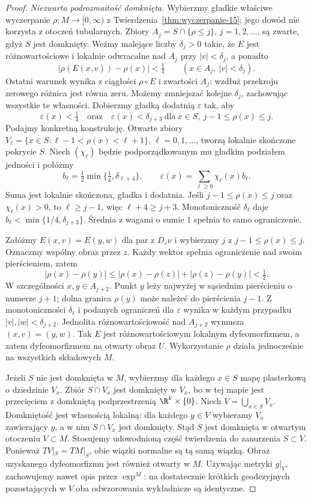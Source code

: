 \begin{proof}
\emph{Niezwarta podrozmaitość domknięta.}
Wybierzmy gładkie właściwe wyczerpanie
$\rho:M\to[0,\infty)$ z
Twierdzenia~\ref{thm:wyczerpanie-15}; jego dowód
nie korzysta z otoczeń tubularnych.
Zbiory $A_j=S\cap\{\rho\leq j\}$, $j=1,2,\ldots$,
są zwarte, gdyż $S$ jest domknięty.
Weźmy malejące liczby $\delta_j>0$
takie, że $E$ jest różnowartościowe
i lokalnie odwracalne nad $A_j$
przy $|v|<\delta_j$, a ponadto
\[
 |\rho(E(x,v))-\rho(x)|<\tfrac14
 \qquad(x\in A_j,\ |v|<\delta_j).
\]
Ostatni warunek wynika z ciągłości $\rho\circ E$
i zwartości $A_j$: wzdłuż przekroju zerowego
różnica jest równa zeru. Możemy zmniejszać kolejne
$\delta_j$, zachowując wszystkie te własności.
Dobierzmy gładką
dodatnią $\varepsilon$ tak, aby
\[
  \varepsilon(x)<\tfrac14
  \quad\text{oraz}\quad
  \varepsilon(x)<\delta_{j+3}
  \ \text{dla}\ x\in S,\
       j-1\leq\rho(x)\leq j.
\]
Podajmy konkretną konstrukcję.
Otwarte zbiory $V_\ell=\{x\in S:\ell-1<\rho(x)<\ell+1\}$,
$\ell=0,1,\ldots$, tworzą lokalnie skończone pokrycie $S$.
Niech $(\chi_\ell)$ będzie podporządkowanym mu gładkim
podziałem jedności i połóżmy
\[
 b_\ell=\tfrac12\min\{\tfrac14,\delta_{\ell+4}\},
 \qquad
 \varepsilon(x)=\sum_{\ell\geq0}\chi_\ell(x)b_\ell.
\]
Suma jest lokalnie skończona, gładka i dodatnia.
Jeśli $j-1\leq\rho(x)\leq j$ oraz $\chi_\ell(x)>0$,
to $\ell\geq j-1$, więc $\ell+4\geq j+3$.
Monotoniczność $\delta_\ell$ daje
$b_\ell<\min\{1/4,\delta_{j+3}\}$.
Średnia z wagami o sumie $1$ spełnia to samo ograniczenie.

Załóżmy $E(x,v)=E(y,w)$ dla par
z $D_\varepsilon\nu$ i wybierzmy $j$
z $j-1\leq\rho(x)\leq j$.
Oznaczmy wspólny obraz przez $z$. Każdy wektor
spełnia ograniczenie nad swoim pierścieniem, zatem
\[
 |\rho(x)-\rho(y)|
 \leq |\rho(x)-\rho(z)|+|\rho(z)-\rho(y)|<\tfrac12.
\]
W szczególności $x,y\in A_{j+2}$.
Punkt $y$ leży najwyżej w sąsiednim
pierścieniu o numerze $j+1$; dolna
granica $\rho(y)$ może należeć
do pierścienia $j-1$. Z monotoniczności
$\delta_\ell$ i podanych ograniczeń
dla $\varepsilon$ wynika w każdym
przypadku $|v|,|w|<\delta_{j+2}$.
Jednolita różnowartościowość nad
$A_{j+2}$ wymusza $(x,v)=(y,w)$.
Tak $E$ jest różnowartościowym
lokalnym dyfeomorfizmem, a zatem
dyfeomorfizmem na otwarty obraz $U$.
Wykorzystanie $\rho$ działa
jednocześnie na wszystkich
składowych $M$.

Jeżeli $S$ nie jest domknięta w $M$,
wybierzmy dla każdego $x\in S$
mapę plasterkową o dziedzinie $V_x$.
Zbiór $S\cap V_x$ jest domknięty
w $V_x$, bo w tej mapie jest
przecięciem z domkniętą
podprzestrzenią $\R^k\times\{0\}$.
Niech $V=\bigcup_{x\in S}V_x$.
Domkniętość jest własnością
lokalną: dla każdego $y\in V$
wybieramy $V_x$ zawierający $y$,
a w nim $S\cap V_x$ jest domknięty.
Stąd $S$ jest domknięta w otwartym
otoczeniu $V\subset M$.
Stosujemy udowodnioną część
twierdzenia do zanurzenia $S\subset V$.
Ponieważ $TV|_S=TM|_S$, obie
wiązki normalne są tą samą wiązką.
Obraz uzyskanego dyfeomorfizmu
jest również otwarty w $M$. Używając metryki $g|_V$,
zachowujemy nawet opis przez $\exp^M$: na dostatecznie
krótkich geodezyjnych pozostających w $V$ oba odwzorowania
wykładnicze są identyczne.
\end{proof}

